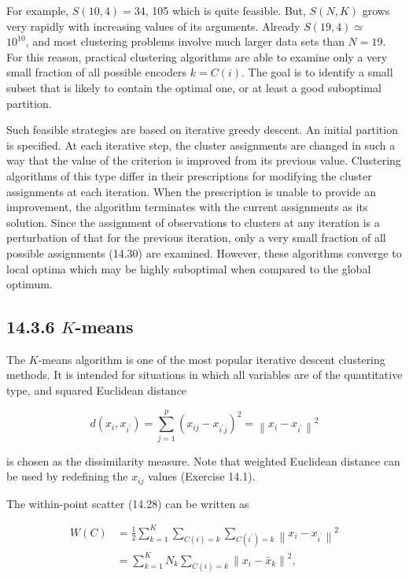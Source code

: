 \documentclass[10pt]{article}
\begin{document}
For example, $S(10,4)=34$, 105 which is quite feasible. But, $S(N, K)$ grows very rapidly with increasing values of its arguments. Already $S(19,4) \simeq$\\
$10^{10}$, and most clustering problems involve much larger data sets than $N=19$. For this reason, practical clustering algorithms are able to examine only a very small fraction of all possible encoders $k=C(i)$. The goal is to identify a small subset that is likely to contain the optimal one, or at least a good suboptimal partition.

Such feasible strategies are based on iterative greedy descent. An initial partition is specified. At each iterative step, the cluster assignments are changed in such a way that the value of the criterion is improved from its previous value. Clustering algorithms of this type differ in their prescriptions for modifying the cluster assignments at each iteration. When the prescription is unable to provide an improvement, the algorithm terminates with the current assignments as its solution. Since the assignment of observations to clusters at any iteration is a perturbation of that for the previous iteration, only a very small fraction of all possible assignments (14.30) are examined. However, these algorithms converge to local optima which may be highly suboptimal when compared to the global optimum.

\subsection*{14.3.6 $K$-means}
The $K$-means algorithm is one of the most popular iterative descent clustering methods. It is intended for situations in which all variables are of the quantitative type, and squared Euclidean distance

$$
d\left(x_{i}, x_{i^{\prime}}\right)=\sum_{j=1}^{p}\left(x_{i j}-x_{i^{\prime} j}\right)^{2}=\left\|x_{i}-x_{i^{\prime}}\right\|^{2}
$$

is chosen as the dissimilarity measure. Note that weighted Euclidean distance can be used by redefining the $x_{i j}$ values (Exercise 14.1).

The within-point scatter (14.28) can be written as


\begin{align*}
W(C) & =\frac{1}{2} \sum_{k=1}^{K} \sum_{C(i)=k} \sum_{C\left(i^{\prime}\right)=k}\left\|x_{i}-x_{i^{\prime}}\right\|^{2} \\
& =\sum_{k=1}^{K} N_{k} \sum_{C(i)=k}\left\|x_{i}-\bar{x}_{k}\right\|^{2}, \tag{14.31}
\end{align*}
\end{document}
